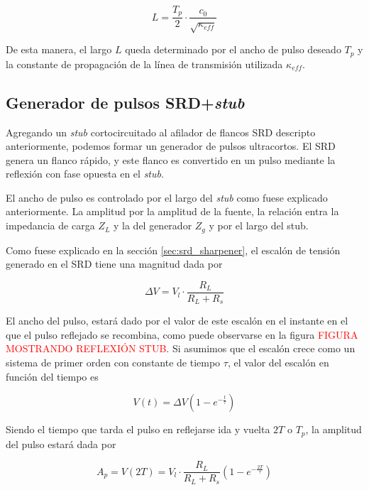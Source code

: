 \begin{equation}
    \label{eq:stub_length_vs_delay}
    L = \frac{T_p}{2} \cdot \frac{c_0}{\sqrt{\kappa_{eff}}}
\end{equation}

De esta manera, el largo $L$ queda determinado por el ancho de pulso deseado
$T_p$ y la constante de propagación de la línea de transmisión utilizada
$\kappa_{eff}$.

\subsection{Generador de pulsos SRD+\textit{stub}}

Agregando un \textit{stub} cortocircuitado al afilador de flancos SRD
descripto anteriormente, podemos formar un generador de pulsos ultracortos. El
SRD genera un flanco rápido, y este flanco es convertido en un pulso
mediante la reflexión con fase opuesta en el \textit{stub}. 

El ancho de pulso es controlado por el largo del \textit{stub} como fuese
explicado anteriormente. La amplitud por la amplitud de la fuente, la relación
entra la impedancia de carga $Z_L$ y la del generador $Z_g$ y por el largo del
stub.

Como fuese explicado en la sección \ref{sec:srd_sharpener}, el escalón de tensión generado en el SRD tiene una magnitud dada por

\begin{equation}
    \Delta V = V_l \cdot \frac{R_L}{R_L+R_s}
\end{equation}

El ancho del pulso, estará dado por el valor de este escalón en el instante en
el que el pulso reflejado se recombina, como puede observarse en la figura
\textcolor{red}{FIGURA MOSTRANDO REFLEXIÓN STUB}. Si asumimos que el escalón
crece como un sistema de primer orden con constante de tiempo $\tau$, el valor
del escalón en función del tiempo es

\begin{equation}
  V(t) = \Delta V \left( 1-e^{-\frac{t}{\tau}}\right)
\end{equation}

Siendo el tiempo que tarda el pulso en reflejarse ida y vuelta $2T$ o $T_p$, la
amplitud del pulso estará dada por

\begin{equation}
    \label{eq:A_p}
    A_p = V(2T) = V_l \cdot \frac{R_L}{R_L+R_s} \left( 1-e^{-\frac{2T}{\tau}}\right)
\end{equation}

